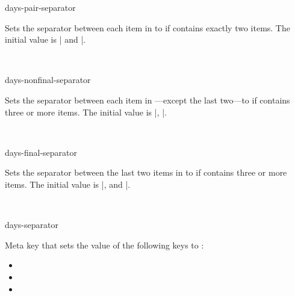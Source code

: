 \documentclass{beerydoc}
\begin{document}
\begin{codedoc}{days-pair-separator}
  \begin{syntax}
  \end{syntax}
  Sets the separator between each item in  to  if
   contains exactly two items.
  The initial value is | and |.
  \begin{codedemo}
    \\
  \end{codedemo}
\end{codedoc}

\begin{codedoc}{days-nonfinal-separator}
  \begin{syntax}
  \end{syntax}
  Sets the separator between each item in ---except the last
  two---to  if  contains three or more items.
  The initial value is |, |.
  \begin{codedemo}
    \\
  \end{codedemo}
\end{codedoc}

\begin{codedoc}{days-final-separator}
  \begin{syntax}
  \end{syntax}
  Sets the separator between the last two items in  to
   if  contains three or more items.
  The initial value is |, and |.
  \begin{codedemo}
    \\
  \end{codedemo}
\end{codedoc}

\begin{codedoc}{days-separator}
  \begin{syntax}
  \end{syntax}
  Meta key that sets the value of the following keys to :
  \begin{itemize}
    \item {}
    \item {}
    \item {}
  \end{itemize}
\end{codedoc}
\end{document}
